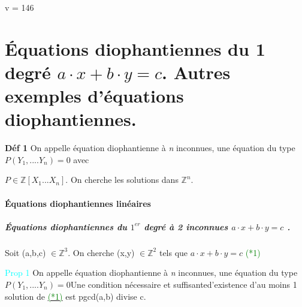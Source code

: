 \documentclass{article}
\begin{document}

v = 146

\part{Équations diophantiennes du
  1\ier{}  degré $a \cdot x+b \cdot y=c$. Autres exemples d'équations diophantiennes.}


\textbf{Déf 1}
On appelle équation diophantienne à \textit{n} inconnues, une équation du type $P(Y_{1},....Y_{n})=0$ avec

$P \in \mathbb{Z}[X_{1}...X_{n}]$. On cherche les solutions dans $\mathbb{Z}^{n}$.
\subsection{Équations diophantiennes linéaires}


\subsubsection{Équations diophantiennes du $1^{er}$ degré à 2 inconnues $a \cdot x+b \cdot y=c$ .}

Soit (a,b,c) $\in \mathbb{Z}^3$. On cherche (x,y) $\in \mathbb{Z}^2$  tels que  $a \cdot x + b \cdot y = c$ 
\hypertarget{here2}{\textcolor{green}{(*1)} }





\textcolor{cyan}{Prop 1}
On appelle équation diophantienne à \textit{n} inconnues, une équation du type $P(Y_{1},....Y_{n})=0$Une condition nécessaire et suffisanted'existence d'au moins 1 solution de    \hyperlink{here2}{\textcolor{green}{(*1)}}
est pgcd(a,b) divise c.
\end{document}
